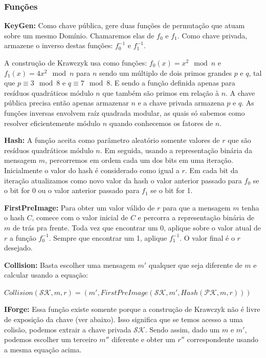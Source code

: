 \documentclass[a4paper]{article}
\begin{document}
\subsubsection{Funções}

\textbf{KeyGen: }Como chave pública, gere duas funções de permutação
que atuam sobre um mesmo Domínio. Chamaremos elas de $f_0$ e
$f_1$. Como chave privada, armazene o inverso destas funções:
$f_0^{-1}$ e $f_1^{-1}$.

A construção de Krawczyk usa como funções: $f_0(x) = x^2 \mod n$ e
$f_1(x) = 4x^2 \mod n$ para $n$ sendo um múltiplo de dois primos
grandes $p$ e $q$, tal que $p \equiv 3 \mod 8$ e $q \equiv 7 \mod
8$. E sendo a função definida apenas para resíduos quadráticos módulo
$n$ que também são primos em relação à $n$. A chave pública precisa
então apenas armazenar $n$ e a chave privada armazena $p$ e $q$. As
funções inversas envolvem raíz quadrada modular, as quais só sabemos
como resolver eficientemente módulo $n$ quando conhecemos os fatores
de $n$.

\textbf{Hash:} A função aceita como parâmetro aleatório somente
valores de $r$ que são resíduos quadráticos módulo $n$. Em seguida,
usando a representação binária da mensagem $m$, percorremos em ordem
cada um dos bits em uma iteração. Inicialmente o valor do hash é
considerado como igual a $r$. Em cada bit da iteração atualizamos como
novo valor da hash o valor anterior passado para $f_0$ se o bit for 0
ou o valor anterior passado para $f_1$ se o bit for 1.

\textbf{FirstPreImage:} Para obter um valor válido de $r$ para que a
mensagem $m$ tenha o hash $C$, comece com o valor inicial de $C$ e
percorra a representação binária de $m$ de trás pra frente. Toda vez
que encontrar um 0, aplique sobre o valor atual de $r$ a função
$f_0^{-1}$. Sempre que encontrar um 1, aplique $f_1^{-1}$. O valor
final é o $r$ desejado.

\textbf{Collision:} Basta escolher uma mensagem $m'$ qualquer que seja
diferente de $m$ e calcular usando a equação:

$Collision(\mathcal{SK}, m, r) = (m', FirstPreImage(\mathcal{SK}, m',
Hash(\mathcal{PK}, m, r)))$

\textbf{IForge:} Essa função existe somente porque a construção de
Krawczyk não é livre de exposição da chave (ver abaixo). Isso
significa que se temos acesso a uma colisão, podemos extrair a chave
privada $\mathcal{SK}$. Sendo assim, dado um $m$ e $m'$, podemos
escolher um terceiro $m''$ diferente e obter um $r''$ correspondente
usando a mesma equação acima.
\end{document}
